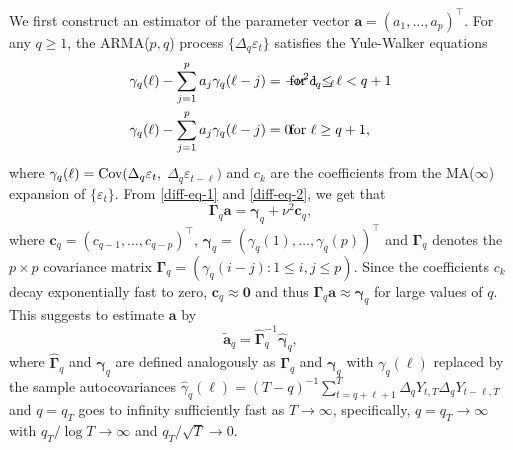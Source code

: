 We first construct an estimator of the parameter vector $\boldsymbol{a} = (a_1,\ldots,a_p)^\top$. For any $q \ge 1$, the ARMA($p,q$) process $\{ \Delta_q \varepsilon_t \}$ satisfies the Yule-Walker equations
\begin{align}
\gamma_q(\ell) - \sum\limits_{j=1}^p a_j \gamma_q(\ell-j) & = -\nu^2 c_{q-\ell} \hspace{-1.5cm} & & \text{for } 1 \le \ell < q+1 \label{diff-eq-1} \\
\gamma_q(\ell) - \sum\limits_{j=1}^p a_j \gamma_q(\ell-j) & = 0 \hspace{-1.5cm} & & \text{for } \ell \ge q+1, \label{diff-eq-2}  
\end{align}
where $\gamma_q(\ell) = \textnormal{Cov}(\Delta_q \varepsilon_t,$ $\Delta_q \varepsilon_{t-\ell})$ and $c_k$ are the coefficients from the MA($\infty$) expansion of $\{ \varepsilon_t \}$. From \eqref{diff-eq-1} and \eqref{diff-eq-2}, we get that 
\begin{equation}\label{YW-eq} 
\boldsymbol{\Gamma}_q \boldsymbol{a} = \boldsymbol{\gamma}_q + \nu^2 \boldsymbol{c}_q,  
\end{equation} 
where $\boldsymbol{c}_q = (c_{q-1},\dots,c_{q-p})^\top$, $\boldsymbol{\gamma}_q = (\gamma_q(1),\dots,\gamma_q(p))^\top$ and $\boldsymbol{\Gamma}_q$ denotes the $p \times p$ covariance matrix $\boldsymbol{\Gamma}_q = (\gamma_q(i-j): 1 \le i,j \le p)$. Since the coefficients $c_k$ decay exponentially fast to zero, $\boldsymbol{c}_q \approx \boldsymbol{0}$ and thus $\boldsymbol{\Gamma}_q \boldsymbol{a} \approx \boldsymbol{\gamma}_q$ for large values of $q$. This suggests to estimate $\boldsymbol{a}$ by 
\begin{equation}\label{est-AR-FS}
\widetilde{\boldsymbol{a}}_q = \widehat{\boldsymbol{\Gamma}}_q^{-1} \widehat{\boldsymbol{\gamma}}_q, 
\end{equation}
where $\widehat{\boldsymbol{\Gamma}}_q$ and $\widehat{\boldsymbol{\gamma}}_q$ are defined analogously as $\boldsymbol{\Gamma}_q$ and $\boldsymbol{\gamma}_q$ with $\gamma_q(\ell)$ replaced by the sample autocovariances $\widehat{\gamma}_q(\ell) = (T-q)^{-1} \sum_{t=q+\ell+1}^T \Delta_q Y_{t,T} \Delta_q Y_{t-\ell,T}$ and $q = q_T$ goes to infinity sufficiently fast as $T \rightarrow \infty$, specifically, $q = q_T \rightarrow \infty$ with $q_T / \log T \rightarrow \infty$ and $q_T/\sqrt{T} \rightarrow 0$. 


